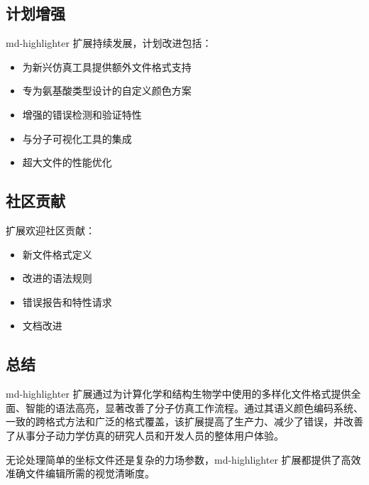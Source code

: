 \subsection{计划增强}

md-highlighter 扩展持续发展，计划改进包括：

\begin{itemize}
    \item 为新兴仿真工具提供额外文件格式支持
    \item 专为氨基酸类型设计的自定义颜色方案
    \item 增强的错误检测和验证特性
    \item 与分子可视化工具的集成
    \item 超大文件的性能优化
\end{itemize}

\subsection{社区贡献}

扩展欢迎社区贡献：
\begin{itemize}
    \item 新文件格式定义
    \item 改进的语法规则
    \item 错误报告和特性请求
    \item 文档改进
\end{itemize}

\subsection{总结}

md-highlighter 扩展通过为计算化学和结构生物学中使用的多样化文件格式提供全面、智能的语法高亮，显著改善了分子仿真工作流程。通过其语义颜色编码系统、一致的跨格式方法和广泛的格式覆盖，该扩展提高了生产力、减少了错误，并改善了从事分子动力学仿真的研究人员和开发人员的整体用户体验。

无论处理简单的坐标文件还是复杂的力场参数，md-highlighter 扩展都提供了高效准确文件编辑所需的视觉清晰度。
